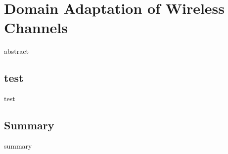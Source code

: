\chapter{Domain Adaptation of Wireless Channels}
\label{chapter4}

abstract

\section{test}
test

\section{Summary}
summary

